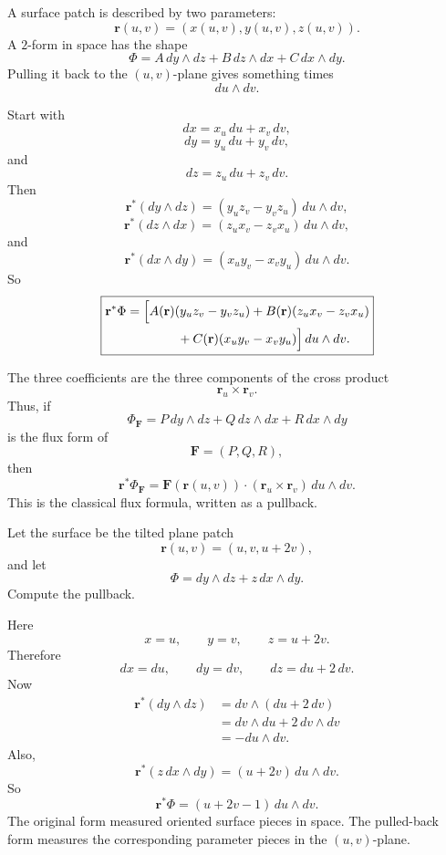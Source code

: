 A surface patch is described by two parameters:
\[
    \mathbf r(u,v)=(x(u,v),y(u,v),z(u,v)).
\]
A \(2\)-form in space has the shape
\[
    \Phi=A\,dy\wedge dz+B\,dz\wedge dx+C\,dx\wedge dy.
\]
Pulling it back to the \((u,v)\)-plane gives something times
\[
    du\wedge dv.
\]

Start with
\[
    dx=x_u\,du+x_v\,dv,
\]
\[
    dy=y_u\,du+y_v\,dv,
\]
and
\[
    dz=z_u\,du+z_v\,dv.
\]
Then
\[
\boxed{
    \mathbf r^*(dy\wedge dz)
    =
    (y_u z_v-y_v z_u)\,du\wedge dv,
}
\]
\[
\boxed{
    \mathbf r^*(dz\wedge dx)
    =
    (z_u x_v-z_v x_u)\,du\wedge dv,
}
\]
and
\[
\boxed{
    \mathbf r^*(dx\wedge dy)
    =
    (x_u y_v-x_v y_u)\,du\wedge dv.
}
\]
So
\[
\boxed{
\begin{aligned}
    \mathbf r^*\Phi
    &=
    \Bigl[
        A(\mathbf r)(y_u z_v-y_v z_u)
        +
        B(\mathbf r)(z_u x_v-z_v x_u)\\
        &\qquad\qquad
        +
        C(\mathbf r)(x_u y_v-x_v y_u)
    \Bigr]\,du\wedge dv.
\end{aligned}
}
\]

The three coefficients are the three components of the cross product
\[
    \mathbf r_u\times\mathbf r_v.
\]
Thus, if
\[
    \Phi_{\mathbf F}
    =
    P\,dy\wedge dz+Q\,dz\wedge dx+R\,dx\wedge dy
\]
is the flux form of
\[
    \mathbf F=(P,Q,R),
\]
then
\[
\boxed{
    \mathbf r^*\Phi_{\mathbf F}
    =
    \mathbf F(\mathbf r(u,v))\cdot
    (\mathbf r_u\times\mathbf r_v)\,du\wedge dv.
}
\]
This is the classical flux formula, written as a pullback.

\begin{example}
Let the surface be the tilted plane patch
\[
    \mathbf r(u,v)=(u,v,u+2v),
\]
and let
\[
    \Phi=dy\wedge dz+z\,dx\wedge dy.
\]
Compute the pullback.

Here
\[
    x=u,
    \qquad
    y=v,
    \qquad
    z=u+2v.
\]
Therefore
\[
    dx=du,
    \qquad
    dy=dv,
    \qquad
    dz=du+2\,dv.
\]
Now
\[
\begin{aligned}
    \mathbf r^*(dy\wedge dz)
    &=
    dv\wedge(du+2\,dv)\\
    &=
    dv\wedge du+2\,dv\wedge dv\\
    &=
    -du\wedge dv.
\end{aligned}
\]
Also,
\[
    \mathbf r^*(z\,dx\wedge dy)
    =
    (u+2v)\,du\wedge dv.
\]
So
\[
\boxed{
    \mathbf r^*\Phi=(u+2v-1)\,du\wedge dv.
}
\]
The original form measured oriented surface pieces in space.  The pulled-back form
measures the corresponding parameter pieces in the \((u,v)\)-plane.
\end{example}

